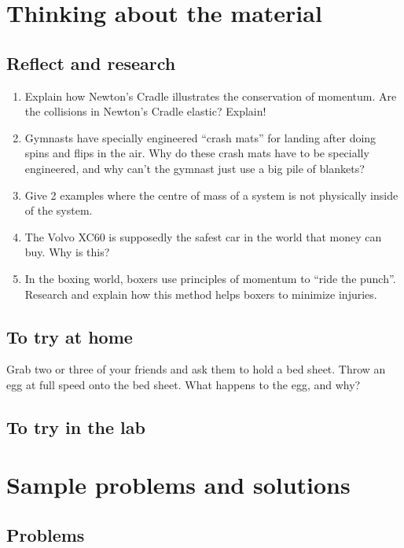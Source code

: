 \newpage
\section{Thinking about the material}
\subsection{Reflect and research}

\begin{enumerate}
\item Explain how Newton's Cradle illustrates the conservation of momentum. Are the collisions in Newton's Cradle elastic? Explain! 
\item Gymnasts have specially engineered ``crash mats'' for landing after doing spins and flips in the air. Why do these crash mats have to be specially engineered, and why can't the gymnast just use a big pile of blankets?
\item Give 2 examples where the centre of mass of a system is not physically inside of the system.
\item The Volvo XC60 is supposedly the safest car in the world that money can buy. Why is this?
\item In the boxing world, boxers use principles of momentum to ``ride the punch''. Research and explain how this method helps boxers to minimize injuries.
\end{enumerate}
\subsection{To try at home}

\begin{tQuestion} Grab two or three of your friends and ask them to hold a bed sheet. Throw an egg at full speed onto the bed sheet. What happens to the egg, and why? \end{tQuestion}

\subsection{To try in the lab}

\newpage
\section{Sample problems and solutions}
\subsection{Problems}


